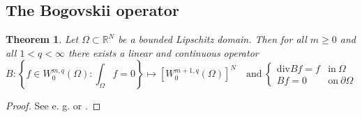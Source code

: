\documentclass[10pt,a4paper]{article}
\newtheorem{theorem}{Theorem}[section]
\newtheorem{lemma}[theorem]{Lemma}
\newcommand{\norm}[1]{{\left\Vert{#1}\right\Vert}}
\newcommand{\abs}[1]{|#1|}
\newcommand{\absB}[1]{\Bigl|#1\Bigr|}
\newcommand{\bfp}{\mathbf{p}}
\numberwithin{equation}{section}
\begin{document}

\subsection{The Bogovskii operator}
\begin{theorem}\label{thm-chap04:Bogovskii} Let $\Omega \subset \mathbb{R}^{N}$ be a bounded Lipschitz domain. Then for all $m \ge 0$ and all $1<q<\infty$ there exists a linear and continuous operator 
\[B:\left\{ f\in W_{0}^{m,q}\left(\Omega\right):\int_{\Omega}f=0\right\} \mapsto\left[W_{0}^{m+1,q}\left(\Omega\right)\right]^{N}\quad\text{and}\ \begin{cases}
\text{div}Bf=f & \text{in}\ \Omega\\
Bf=0 & \text{on}\ \partial\Omega
\end{cases}\]
\end{theorem}
\begin{proof}
    See e. g.  \cite{Bog} or \cite[Section 3.3]{Galdi-book}.
\end{proof}  
\end{document}

